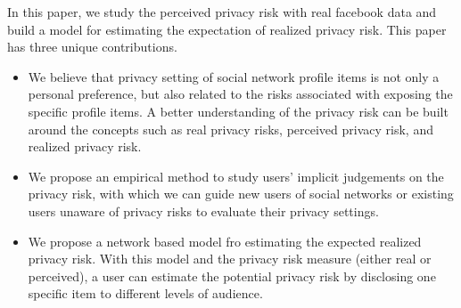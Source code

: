 \documentclass[a4paper]{article}
\begin{document}
In this paper, we study the perceived privacy risk with real facebook
data and build a model for estimating the expectation of realized
privacy risk. This paper has three unique contributions. 
\begin{itemize}
\item We believe that privacy setting of social network profile items
  is not only a personal preference, but also related to the risks
  associated with exposing the specific profile items. A better
  understanding of the privacy risk can be built around the concepts
  such as real privacy risks, perceived privacy risk, and realized
  privacy risk. 

\item We propose an empirical method to study users' implicit
  judgements on the privacy risk, with which we can guide new users of
  social networks or existing users unaware of privacy risks to
  evaluate their privacy settings. 

\item We propose a network based model fro estimating the expected
  realized privacy risk. With this model and the privacy risk measure
  (either real or perceived), a user can estimate the potential
  privacy risk by disclosing one specific item to different levels of
  audience. 
\end{itemize}




\end{document}
